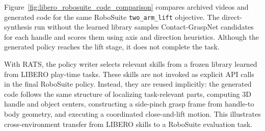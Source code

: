 Figure~\ref{fig:libero_robosuite_code_comparison} compares archived videos and generated code for the same RoboSuite \texttt{two\_arm\_lift} objective. The direct-synthesis run without the learned library samples Contact-GraspNet candidates for each handle and scores them using axis and direction heuristics. Although the generated policy reaches the lift stage, it does not complete the task.

With RATS, the policy writer selects relevant skills from a frozen library learned from LIBERO play-time tasks. These skills are not invoked as explicit API calls in the final RoboSuite policy. Instead, they are reused implicitly: the generated code follows the same structure of localizing task-relevant parts, computing 3D handle and object centers, constructing a side-pinch grasp frame from handle-to body geometry, and executing a coordinated close-and-lift motion. This illustrates cross-environment transfer from LIBERO skills to a RoboSuite evaluation task.
